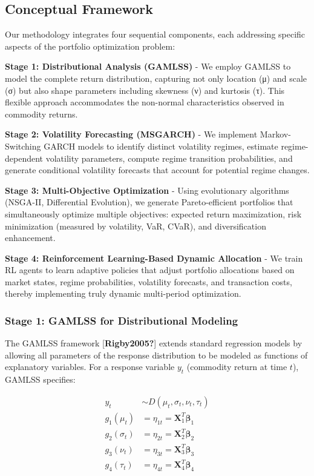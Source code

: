 \documentclass[
  10pt,
  a4paper,
]{article}
\begin{document}
\subsection{Conceptual Framework}\label{sec-framework}

Our methodology integrates four sequential components, each addressing
specific aspects of the portfolio optimization problem:

\textbf{Stage 1: Distributional Analysis (GAMLSS)} - We employ GAMLSS to
model the complete return distribution, capturing not only location (μ)
and scale (σ) but also shape parameters including skewness (ν) and
kurtosis (τ). This flexible approach accommodates the non-normal
characteristics observed in commodity returns.

\textbf{Stage 2: Volatility Forecasting (MSGARCH)} - We implement
Markov-Switching GARCH models to identify distinct volatility regimes,
estimate regime-dependent volatility parameters, compute regime
transition probabilities, and generate conditional volatility forecasts
that account for potential regime changes.

\textbf{Stage 3: Multi-Objective Optimization} - Using evolutionary
algorithms (NSGA-II, Differential Evolution), we generate
Pareto-efficient portfolios that simultaneously optimize multiple
objectives: expected return maximization, risk minimization (measured by
volatility, VaR, CVaR), and diversification enhancement.

\textbf{Stage 4: Reinforcement Learning-Based Dynamic Allocation} - We
train RL agents to learn adaptive policies that adjust portfolio
allocations based on market states, regime probabilities, volatility
forecasts, and transaction costs, thereby implementing truly dynamic
multi-period optimization.

\subsubsection{Stage 1: GAMLSS for Distributional
Modeling}\label{sec-gamlss}

The GAMLSS framework {[}\textbf{Rigby2005?}{]} extends standard
regression models by allowing all parameters of the response
distribution to be modeled as functions of explanatory variables. For a
response variable \(y_t\) (commodity return at time \(t\)), GAMLSS
specifies:

\[
\begin{aligned}
y_t &\sim D(\mu_t, \sigma_t, \nu_t, \tau_t) \\
g_1(\mu_t) &= \eta_{1t} = \mathbf{X}_1^T \boldsymbol{\beta}_1 \\
g_2(\sigma_t) &= \eta_{2t} = \mathbf{X}_2^T \boldsymbol{\beta}_2 \\
g_3(\nu_t) &= \eta_{3t} = \mathbf{X}_3^T \boldsymbol{\beta}_3 \\
g_4(\tau_t) &= \eta_{4t} = \mathbf{X}_4^T \boldsymbol{\beta}_4
\end{aligned}
\]
\end{document}
